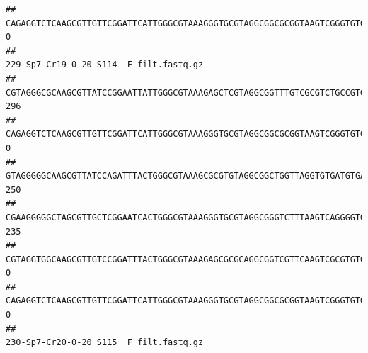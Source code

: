 \documentclass[]{article}
\begin{document}
\begin{verbatim}
## CAGAGGTCTCAAGCGTTGTTCGGATTCATTGGGCGTAAAGGGTGCGTAGGCGGCGCGGTAAGTCGGGTGTGAAATCTCGGGGCTTAACTCCGAAACTGCATTCGATACTGCCGTGCTTGAGGACTGGAGAGGAGACTGGAATTTACGGTGTAGCGGTGAAATGCGTAGATATCGTAAGGAAGACCAGTGGCGAAGGCGGGTCTCTGGACAGTTCCTGACGCTGAGGCACGAAGGCCAGGGGAGCAAACG                                       0
##                                                                                                                                                                                                                                                           229-Sp7-Cr19-0-20_S114__F_filt.fastq.gz
## CGTAGGGCGCAAGCGTTATCCGGAATTATTGGGCGTAAAGAGCTCGTAGGCGGTTTGTCGCGTCTGCCGTGAAAGTCCGGGGCTCAACTCCGGATCTGCGGTGGGTACGGGCAGACTAGAGTGATGTAGGGGAGACTGGAATTCCTGGTGTAGCGGTGAAATGCGCAGATATCAGGAGGAACACCGATGGCGAAGGCAGGTCTCTGGGCATTAACTGACGCTGAGGAGCGAAAGCATGGGGAGCGAACA                                     296
## CAGAGGTCTCAAGCGTTGTTCGGATTCATTGGGCGTAAAGGGTGCGTAGGCGGCGCGGTAAGTCGGGTGTGAAATCTCGGAGCTTAACTCCGAAACTGCATTCGATACTGCCGTGCTTGAGGACTGGAGAGGAGACTGGAATTTACGGTGTAGCGGTGAAATGCGTAGATATCGTAAGGAAGACCAGTGGCGAAGGCGGGTCTCTGGACAGTTCCTGACGCTGAGGCACGAAGGCCAGGGGAGCAAACG                                       0
## GTAGGGGGCAAGCGTTATCCAGATTTACTGGGCGTAAAGCGCGTGTAGGCGGCTGGTTAGGTGTGATGTGAAATCTTCCGGCTCAACCGGAAAACTGCATTGCAAACCGGCCTGGCTAGAGTGCAGGAGAGGGAAGCGGAATTCCAGGTGTAGCGGTGAAATGCGTAGATATCTGGAGGAACACCAGTGGCGAAGGCGGCTTCCTGGCCTGCAACTGACGCTGAGACGCGAAAGCGTGGGGAGCGAAC                                      250
## CGAAGGGGGCTAGCGTTGCTCGGAATCACTGGGCGTAAAGGGTGCGTAGGCGGGTCTTTAAGTCAGGGGTGAAATCCTGGAGCTCAACTCCAGAACTGCCTTTGATACTGAAGATCTTGAGTTCGGGAGAGGTGAGTGGAACTGCGAGTGTAGAGGTGAAATTCGTAGATATTCGCAAGAACACCAGTGGCGAAGGCGGCTCACTGGCCCGATACTGACGCTGAGGCACGAAAGCGTGGGGAGCAAACA                                     235
## CGTAGGTGGCAAGCGTTGTCCGGATTTACTGGGCGTAAAGAGCGCGCAGGCGGTCGTTCAAGTCGCGTGTGAAAGCCCCCGGCTCAACTGGGGAGGGTCACGCGATACTGATCGACTCGAAGGCAGGAGAGGGTAGTGGAATTCCCGGTGTAGTGGTGAAATGCGTAGATATCGGGAGGAACACCAGTGGCGAAGGCGACTACCTGGCCTGTTCTTGACGCTGAGGCGCGAAAGCTAGGGGAGCAAACG                                       0
## CAGAGGTCTCAAGCGTTGTTCGGATTCATTGGGCGTAAAGGGTGCGTAGGCGGCGCGGTAAGTCGGGTGTGAAATCTCGGGGCTTAACTCCGAAACTGCATTCGATACTGCCGTGCTTGAGGACTGGAGAGGAGACTGGAATTTACGGTGTAGCGGTGAAATGCGTAGATATCGTAAGGAAGACCAGTGGCGAAGGCGGGTCTCTGGACAGTTCCTGACGCTGAGGCACGAAGGCCAGGGGAGCAAACG                                       0
##                                                                                                                                                                                                                                                           230-Sp7-Cr20-0-20_S115__F_filt.fastq.gz

\end{verbatim}
\end{document}
